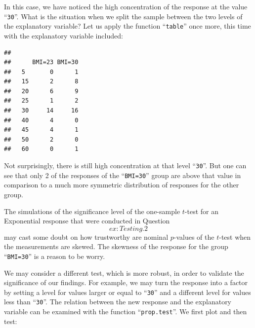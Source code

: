 \documentclass[]{krantz}
\makeatletter
\newenvironment{Shaded}{\begin{snugshade}}{\end{snugshade}}
\newcommand{\DataTypeTok}[1]{\textcolor[rgb]{0.13,0.29,0.53}{#1}}
\newcommand{\DecValTok}[1]{\textcolor[rgb]{0.00,0.00,0.81}{#1}}
\newcommand{\KeywordTok}[1]{\textcolor[rgb]{0.13,0.29,0.53}{\textbf{#1}}}
\newcommand{\NormalTok}[1]{#1}
\newcommand{\OperatorTok}[1]{\textcolor[rgb]{0.81,0.36,0.00}{\textbf{#1}}}
\newenvironment{kframe}{%
\medskip{}
\setlength{\fboxsep}{.8em}
 \def\at@end@of@kframe{}%
 \ifinner\ifhmode%
  \def\at@end@of@kframe{\end{minipage}}%
  \begin{minipage}{\columnwidth}%
 \fi\fi%
 \def\FrameCommand##1{\hskip\@totalleftmargin \hskip-\fboxsep
 \colorbox{shadecolor}{##1}\hskip-\fboxsep
     \hskip-\linewidth \hskip-\@totalleftmargin \hskip\columnwidth}%
 \MakeFramed {\advance\hsize-\width
   \@totalleftmargin\z@ \linewidth\hsize
   \@setminipage}}%
 {\par\unskip\endMakeFramed%
 \at@end@of@kframe}
\renewenvironment{Shaded}{\begin{kframe}}{\end{kframe}}
\theoremstyle{definition}
\theoremstyle{definition}
\theoremstyle{definition}
\theoremstyle{remark}
\makeatother
\begin{document}
In this case, we have noticed the high concentration of the response at
the value ``\texttt{30}''. What is the situation when we split the sample between
the two levels of the explanatory variable? Let us apply the function
``\texttt{table}'' once more, this time with the explanatory variable included:

\begin{Shaded}
\end{Shaded}

\begin{verbatim}
##     
##      BMI=23 BMI=30
##   5       0      1
##   15      2      8
##   20      6      9
##   25      1      2
##   30     14     16
##   40      4      0
##   45      4      1
##   50      2      0
##   60      0      1
\end{verbatim}

Not surprisingly, there is still high concentration at that level
``\texttt{30}''. But one can see that only 2 of the responses of the ``\texttt{BMI=30}''
group are above that value in comparison to a much more symmetric
distribution of responses for the other group.

The simulations of the significance level of the one-sample \(t\)-test for
an Exponential response that were conducted in Question~\[ex:Testing.2\]
may cast some doubt on how trustworthy are nominal \(p\)-values of the
\(t\)-test when the measurements are skewed. The skewness of the response
for the group ``\texttt{BMI=30}'' is a reason to be worry.

We may consider a different test, which is more robust, in order to
validate the significance of our findings. For example, we may turn the
response into a factor by setting a level for values larger or equal to
``\texttt{30}'' and a different level for values less than ``\texttt{30}''. The relation
between the new response and the explanatory variable can be examined
with the function ``\texttt{prop.test}''. We first plot and then test:

\begin{Shaded}
\end{Shaded}
\end{document}
